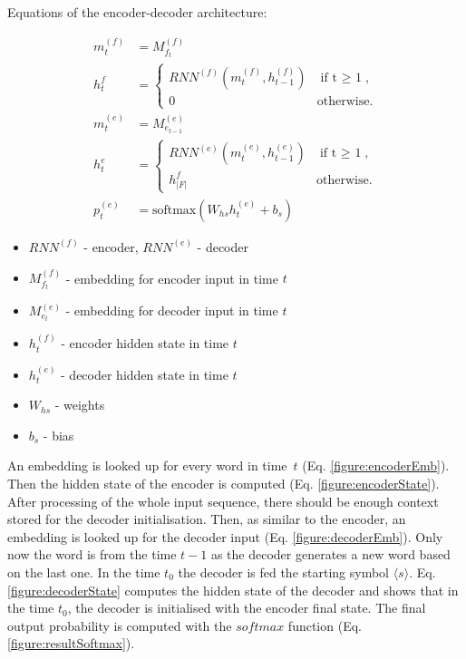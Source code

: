 \documentclass{ExcelAtFIT}
\begin{document}
\hfill \break
Equations of the encoder-decoder architecture:
\begin{linenomath}
\begin{align}
    m^{(f)}_{t}&=M^{(f)}_{f_t}\label{figure:encoderEmb} \\
    h^{f}_{t}&=\begin{cases}
                    RNN^{(f)}(m^{(f)}_{t},h^{(f)}_{t-1}) & \mbox{if t $\geq$ 1},\label{figure:encoderState} \\
                    0 & \mbox{otherwise}.
                \end{cases}\\
    m^{(e)}_{t}&=M^{(e)}_{e_{t-1}}\label{figure:decoderEmb} \\
    h^{e}_{t}&=\begin{cases}
                    RNN^{(e)}(m^{(e)}_{t},h^{(e)}_{t-1}) & \mbox{if t $\geq$ 1},\\
                    h^{f}_{|F|} & \mbox{otherwise}.
                \end{cases}\label{figure:decoderState} \\
    p^{(e)}_{t}&=\mbox{softmax}(W_{hs}h^{(e)}_{t} + b_{s}) \label{figure:resultSoftmax}
\end{align}
\end{linenomath}

\begin{itemize}
    \item $RNN^{(f)}$ - encoder, $RNN^{(e)}$ - decoder
    \item $M^{(f)}_{f_t}$ - embedding for encoder input in time $t$
    \item $M^{(e)}_{e_t}$ - embedding for decoder input in time $t$
    \item $h^{(f)}_t$ - encoder hidden state in time $t$
    \item $h^{(e)}_t$ - decoder hidden state in time $t$
    \item $W_{hs}$ - weights
    \item $b_s$ - bias
\end{itemize}


An embedding is looked up for every word in time~$t$ (Eq. \ref{figure:encoderEmb}). Then the hidden state of the encoder is computed (Eq. \ref{figure:encoderState}). After processing of the whole input sequence, there should be enough context stored for the decoder initialisation. Then, as similar to the encoder, an embedding is looked up for the decoder input (Eq. \ref{figure:decoderEmb}). Only now the word is from the time $t - 1$ as the decoder generates a new word based on the last one. In the time $t_0$ the decoder is fed the starting symbol $\langle s \rangle$. Eq. \ref{figure:decoderState} computes the hidden state of the decoder and shows that in the time $t_0$, the decoder is initialised with the encoder final state. The final output probability is computed with the $softmax$ function (Eq. \ref{figure:resultSoftmax}).
\end{document}
